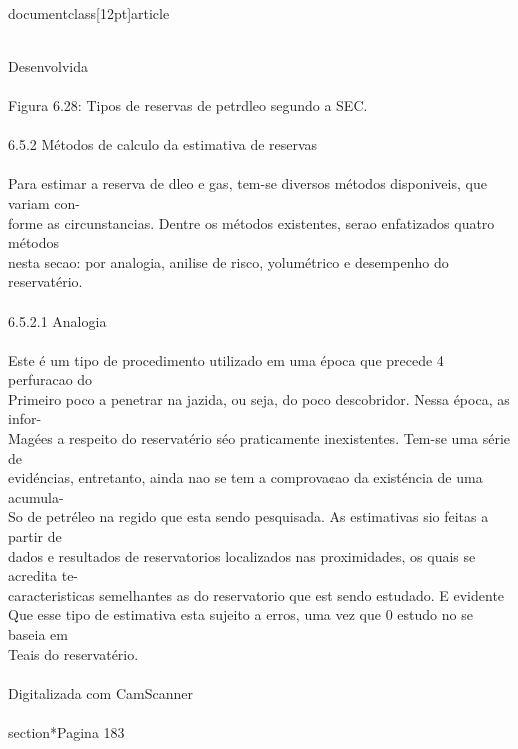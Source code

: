 \\documentclass[12pt]{article}
\begin{document}
\\
Desenvolvida\\
\\
Figura 6.28: Tipos de reservas de petrdleo segundo a SEC.\\
\\
6.5.2 Métodos de calculo da estimativa de reservas\\
\\
Para estimar a reserva de dleo e gas, tem-se diversos métodos disponiveis, que variam con-\\
forme as circunstancias. Dentre os métodos existentes, serao enfatizados quatro métodos\\
nesta secao: por analogia, anilise de risco, yolumétrico e desempenho do reservatério.\\
\\
6.5.2.1 Analogia\\
\\
Este é um tipo de procedimento utilizado em uma época que precede 4 perfuracao do\\
Primeiro poco a penetrar na jazida, ou seja, do poco descobridor. Nessa época, as infor-\\
Magées a respeito do reservatério séo praticamente inexistentes. Tem-se uma série de\\
evidéncias, entretanto, ainda nao se tem a comprova¢ao da existéncia de uma acumula-\\
So de petréleo na regido que esta sendo pesquisada. As estimativas sio feitas a partir de\\
dados e resultados de reservatorios localizados nas proximidades, os quais se acredita te-\\
caracteristicas semelhantes as do reservatorio que est sendo estudado. E evidente\\
Que esse tipo de estimativa esta sujeito a erros, uma vez que 0 estudo no se baseia em\\
Teais do reservatério.\\
\\
Digitalizada com CamScanner\\

\\section*{Pagina 183}
\end{document}
